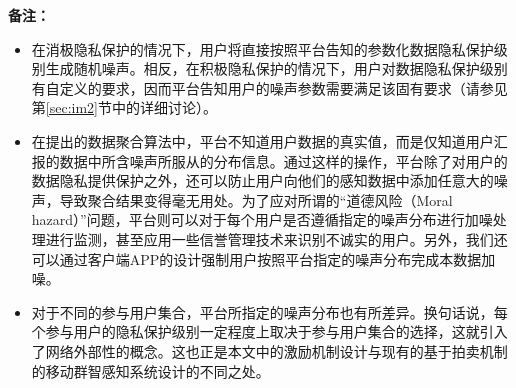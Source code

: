 \noindent\textbf{备注：} 
	\begin{itemize}
	\item 在消极隐私保护的情况下，用户将直接按照平台告知的参数化数据隐私保护级别生成随机噪声。相反，在积极隐私保护的情况下，用户对数据隐私保护级别有自定义的要求，因而平台告知用户的噪声参数需要满足该固有要求（请参见第\ref{sec:im2}节中的详细讨论）。
	
	\item 在提出的数据聚合算法中，平台不知道用户数据的真实值，而是仅知道用户汇报的数据中所含噪声所服从的分布信息。通过这样的操作，平台除了对用户的数据隐私提供保护之外，还可以防止用户向他们的感知数据中添加任意大的噪声，导致聚合结果变得毫无用处。为了应对所谓的“道德风险（{\kaishu Moral hazard}）”问题，平台则可以对于每个用户是否遵循指定的噪声分布进行加噪处理进行监测，甚至应用一些信誉管理技术来识别不诚实的用户\cite{tmc}。另外，我们还可以通过客户端APP的设计强制用户按照平台指定的噪声分布完成本数据加噪。

	\item 对于不同的参与用户集合，平台所指定的噪声分布也有所差异。换句话说，每个参与用户的隐私保护级别一定程度上取决于参与用户集合的选择，这就引入了{\kaishu 网络外部性}的概念。这也正是本文中的激励机制设计与现有的基于拍卖机制的移动群智感知系统设计的不同之处。
	
	\end{itemize}
	
